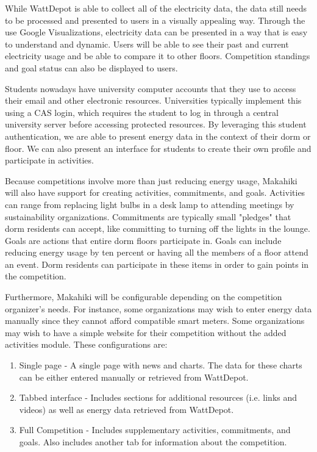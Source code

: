 While WattDepot is able to collect all of the electricity data, the data still needs to be processed and presented to users in a visually appealing way.  Through the use Google Visualizations, electricity data can be presented in a way that is easy to understand and dynamic.  Users will be able to see their past and current electricity usage and be able to compare it to other floors.  Competition standings and goal status can also be displayed to users.

Students nowadays have university computer accounts that they use to access their email and other electronic resources.  Universities typically implement this using a CAS login, which requires the student to log in through a central university server before accessing protected resources.  By leveraging this student authentication, we are able to present energy data in the context of their dorm or floor.  We can also present an interface for students to create their own profile and participate in activities.

Because competitions involve more than just reducing energy usage, Makahiki will also have support for creating activities, commitments, and goals.  Activities can range from replacing light bulbs in a desk lamp to attending meetings by sustainability organizations.  Commitments are typically small "pledges" that dorm residents can accept, like committing to turning off the lights in the lounge.  Goals are actions that entire dorm floors participate in.  Goals can include reducing energy usage by ten percent or having all the members of a floor attend an event.  Dorm residents can participate in these items in order to gain points in the competition.

Furthermore, Makahiki will be configurable depending on the competition organizer's needs.  For instance, some organizations may wish to enter energy data manually since they cannot afford compatible smart meters.  Some organizations may wish to have a simple website for their competition without the added activities module.  These configurations are:

\begin{enumerate}
	\item Single page - A single page with news and charts.  The data for these charts can be either entered manually or retrieved from WattDepot.
	\item Tabbed interface - Includes sections for additional resources (i.e. links and videos) as well as energy data retrieved from WattDepot.
	\item Full Competition - Includes supplementary activities, commitments, and goals.  Also includes another tab for information about the competition.
\end{enumerate}

